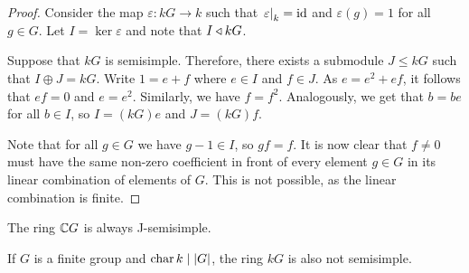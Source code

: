 \begin{proof}
Consider the map $\varepsilon \colon kG \to k$ such that
$\left. \varepsilon\right|_{k}^{} = \operatorname{id}$ and $\varepsilon(g) = 1$ for all
$g \in G$. Let $I = \ker \varepsilon$ and note that $I \triangleleft kG$.

Suppose that $kG$ is semisimple. Therefore, there exists a
submodule $J \leq kG$ such that $I \oplus J = kG$. Write
$1 = e + f$ where $e \in I$ and $f \in J$. As $e = e^2 + ef$, it
follows that $ef = 0$ and $e = e^2$. Similarly, we have $f = f^2$.
Analogously, we get that $b = be$ for all $b \in I$, so $I = (kG)e$
and $J = (kG)f$.

Note that for all $g \in G$ we have $g - 1 \in I$, so $gf = f$. It
is now clear that $f \ne 0$ must have the same non-zero coefficient
in front of every element $g \in G$ in its linear combination of
elements of $G$. This is not possible, as the linear combination is
finite.
\end{proof}

\begin{opomba}
The ring $\mathbb{C} G$ is always J-semisimple.
\end{opomba}

\begin{opomba}
If $G$ is a finite group and $\operatorname{char} k \mid \left\lvert G\right\rvert$, the ring $kG$
is also not semisimple.
\end{opomba}
